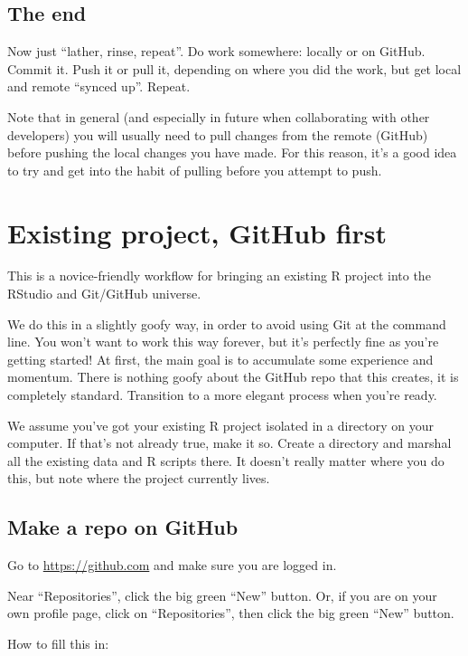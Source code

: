\documentclass[
]{book}
\begin{document}
\section{The end}\label{the-end}

Now just ``lather, rinse, repeat''.
Do work somewhere: locally or on GitHub.
Commit it.
Push it or pull it, depending on where you did the work, but get local and remote ``synced up''.
Repeat.

Note that in general (and especially in future when collaborating with other developers) you will usually need to pull changes from the remote (GitHub) before pushing the local changes you have made.
For this reason, it's a good idea to try and get into the habit of pulling before you attempt to push.

\chapter{Existing project, GitHub first}\label{existing-github-first}

This is a novice-friendly workflow for bringing an existing R project into the RStudio and Git/GitHub universe.

We do this in a slightly goofy way, in order to avoid using Git at the command line.
You won't want to work this way forever, but it's perfectly fine as you're getting started!
At first, the main goal is to accumulate some experience and momentum.
There is nothing goofy about the GitHub repo that this creates, it is completely standard.
Transition to a more elegant process when you're ready.

We assume you've got your existing R project isolated in a directory on your computer.
If that's not already true, make it so.
Create a directory and marshal all the existing data and R scripts there.
It doesn't really matter where you do this, but note where the project currently lives.

\section{Make a repo on GitHub}\label{make-a-repo-on-github-3}

Go to \url{https://github.com} and make sure you are logged in.

Near ``Repositories'', click the big green ``New'' button.
Or, if you are on your own profile page, click on ``Repositories'', then click the big green ``New'' button.

How to fill this in:
\end{document}
